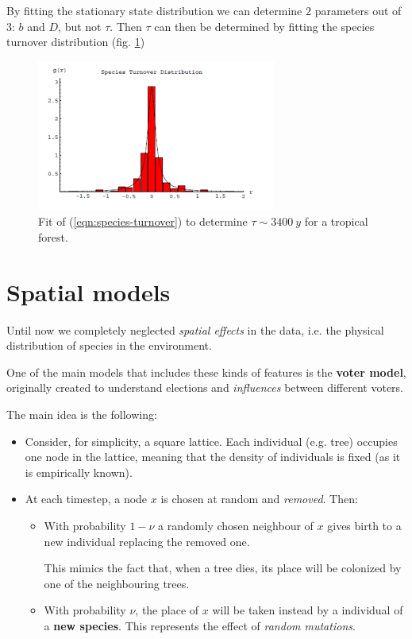 \documentclass[../../main.tex]{subfiles}
\begin{document}
By fitting the stationary state distribution we can determine $2$ parameters out of $3$: $b$ and $D$, but not $\tau$. Then $\tau$ can then be determined by fitting the species turnover distribution (fig. \ref{fig:speciesturnover})

\begin{figure}[H]
    \centering
    \includegraphics[width=0.7\textwidth]{speciesturnover.png}
    \caption{Fit of (\ref{eqn:species-turnover}) to determine $\tau \sim \SI{3400}{y}$ for a tropical forest.}
    \label{fig:speciesturnover}
\end{figure}

\section{Spatial models}
Until now we completely neglected \textit{spatial effects} in the data, i.e. the physical distribution of species in the environment. 

One of the main models that includes these kinds of features is the \textbf{voter model}, originally created to understand elections and \textit{influences} between different voters.

The main idea is the following:
\begin{itemize}
    \item Consider, for simplicity, a square lattice. Each individual (e.g. tree) occupies one node in the lattice, meaning that the density of individuals is fixed (as it is empirically known).
    \item At each timestep, a node $x$ is chosen at random and \textit{removed}. Then:
    \begin{itemize}
        \item With probability $1-\nu$ a randomly chosen neighbour of $x$ gives birth to a new individual replacing the removed one.
        
        This mimics the fact that, when a tree dies, its place will be colonized by one of the neighbouring trees.  
        \item With probability $\nu$, the place of $x$ will be taken instead by a individual of a \textbf{new species}. This represents the effect of \textit{random mutations}.  
    \end{itemize}
\end{itemize}
\end{document}
